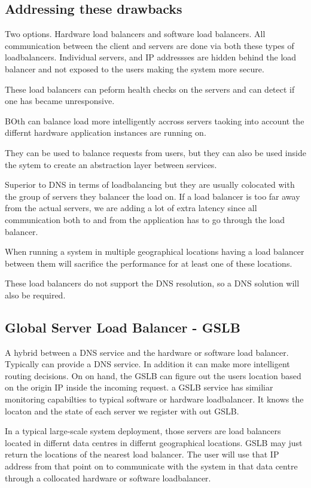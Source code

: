\documentclass[a4paper, 11pt]{book}
\begin{document}
    \subsection{Addressing these drawbacks}
    Two options. Hardware load balancers and software load balancers.
    All communication between the client and servers are done via both these types of loadbalancers.
    Individual servers, and IP addressses are hidden behind the load balancer and not exposed to the users making the system more secure.

    These load balancers can peform health checks on the servers and can detect if one has became unresponsive.

    BOth can balance load more intelligently accross servers taoking into account the differnt hardware application instances are running on.

    They can be used to balance requests from users, but they can also be used inside the sytem to create an abstraction layer between services.

    Superior to DNS in terms of loadbalancing but they are usually colocated with the group of servers they balancer the load on.
    If a load balancer is too far away from the actual servers, we are adding a lot of extra latency since all communication both to and from the application has to go through the load balancer.

    When running a system in multiple geographical locations having a load balancer between them will sacrifice the performance for at least one of these locations.

    These load balancers do not support the DNS resolution, so a DNS solution will also be required.

    \subsection{Global Server Load Balancer - GSLB}
    A hybrid between a DNS service and the hardware or software load balancer.
    Typically can provide a DNS service.
    In addition it can make more intelligent routing decisions.
    On on hand, the GSLB can figure out the users location based on the origin IP inside the incoming request.
    a GSLB service has similiar monitoring capabilties to typical software or hardware loadbalancer.
    It knows the locaton and the state of each server we register with out GSLB.

    In a typical large-scale system deployment, those servers are load balancers located in differnt data centres in differnt geographical locations.
    GSLB may just return the locations of the nearest load balancer.
    The user will use that IP address from that point on to communicate with the system in that data centre through a collocated hardware or software loadbalancer.
\end{document}
